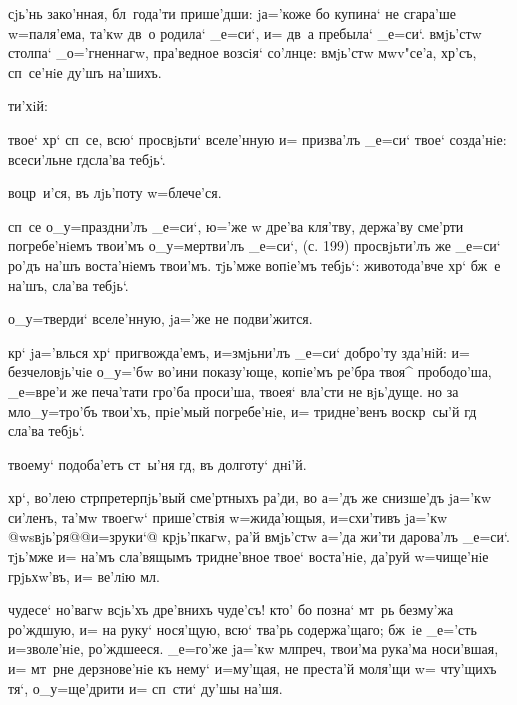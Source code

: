      сjь'нь 
зако'нная, бл~года'ти прише'дши: jа='коже бо купина` не 
сгара'ше w=паля'ема, та'кw дв~о родила` _е=си`, и= дв~а 
пребыла` _е=си`. вмjь'стw столпа` _о='гненнагw, 
пра'ведное возсiя` со'лнце: вмjь'стw мwv"се'а, хр'съ, 
сп~се'нiе ду'шъ на'шихъ.

     ти'хiй: 


 твое` хр` сп~се, всю` просвjьти` 
вселе'нную и= призва'лъ _е=си` твое` созда'нiе: 
всеси'льне гд сла'ва тебjь`.


  воцр~и'ся, въ лjь'поту w=блече'ся.

 сп~се о_у=праздни'лъ _е=си`, ю='же w\т 
дре'ва кля'тву, держа'ву сме'рти погребе'нiемъ твои'мъ 
о_у=мертви'лъ _е=си`, (с. 199) просвjьти'лъ же _е=си` 
ро'дъ на'шъ воста'нiемъ твои'мъ. тjь'мже вопiе'мъ тебjь`: 
животода'вче хр` бж~е на'шъ, сла'ва тебjь`.

  о_у=тверди` вселе'нную, jа='же не 
подви'жится.

 кр` jа='влься хр` пригвожда'емъ, 
и=змjьни'лъ _е=си` добро'ту зда'нiй: и= безчеловjь'чiе 
о_у='бw во'ини показу'юще, копiе'мъ ре'бра твоя^ 
прободо'ша, _е=вре'и же печа'тати гро'ба проси'ша, твоея` 
вла'сти не вjь'дуще. но за мл о_у=тро'бъ твои'хъ, 
прiе'мый погребе'нiе, и= тридне'венъ воскр~сы'й гд 
сла'ва тебjь`.

  твоему` подоба'етъ ст~ы'ня гд, въ 
долготу` днi'й.

 хр`, во'лею стр претерпjь'вый 
сме'ртныхъ ра'ди, во а='дъ же снизше'дъ jа='кw си'ленъ, 
та'мw твоегw` прише'ствiя w=жида'ющыя, и=схи'тивъ jа='кw 
@w\т sвjь'ря@{@и=з\ъ руки`@} крjь'пкагw, ра'й вмjь'стw 
а='да жи'ти дарова'лъ _е=си`. тjь'мже и= на'мъ сла'вящымъ 
тридне'вное твое` воста'нiе, да'руй w=чище'нiе грjьхw'въ, 
и= ве'лiю мл.

 чудесе` 
но'вагw всjь'хъ дре'внихъ чуде'съ! кто' бо позна` мт~рь 
без\ъ му'жа ро'ждшую, и= на руку` нося'щую, всю` тва'рь 
содержа'щаго; бж~iе _е='сть и=зволе'нiе, ро'ждшееся. 
_е=го'же jа='кw мл преч, твои'ма рука'ма 
носи'вшая, и= мт~рне дерзнове'нiе къ нему` и=му'щая, не 
преста'й моля'щи w= чту'щихъ тя`, о_у=ще'дрити и= сп~сти` 
ду'шы на'шя.


